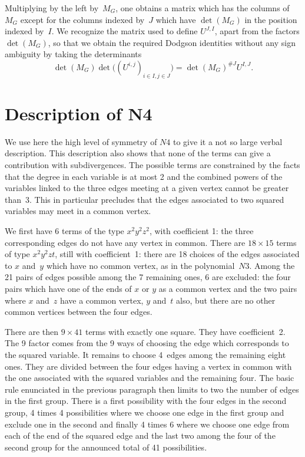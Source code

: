 \documentclass[pdftex]{sigma}
\numberwithin{equation}{section}
\begin{document}
Multiplying by the left by~$M_G$, one obtains a matrix which has the columns of~$M_G$ except for the columns indexed
by~$J$ which have $\det(M_G)$ in the position indexed by~$I$. We recognize the matrix used to define $U^{J,I}$,
apart from the factors $\det(M_G)$, so that we obtain the required Dodgson identities without any sign ambiguity by
taking the determinants
\[
	\det(M_G) \det\bigl( (U^{i,j})_{i\in I,j\in J} \bigr) = \det(M_G)^{\# J} U^{I ,J}.
\]

\section[Description of N4]{Description of $\boldsymbol{N4}$} \label{N4}

We use here the high level of symmetry of $N4$ to give it a not so large verbal description. This description also
shows that none of the terms can give a contribution with subdivergences. The possible terms are constrained by the facts
that the degree in each variable is at most 2
and the combined powers of the variables linked
to the three edges meeting at a given vertex cannot be greater than~3. This in particular precludes that the edges
associated to two squared variables may meet in a common vertex.

We first have 6 terms of the type $x^2 y^2 z^2$, with coefficient 1: the three corresponding edges do not have any vertex in
common. There are $18 \times 15$ terms of type $x^2 y^2 z t$, still with coefficient~1: there are 18 choices of the
edges associated to $x$ and~$y$ which have no common vertex, as in the polynomial~$N3$. Among the 21 pairs of edges
possible among the 7 remaining ones, 6 are excluded: the four pairs which have one of the ends of $x$ or $y$ as a
common vertex and the two pairs where $x$ and~$z$ have a common vertex, $y$ and~$t$ also, but there are no other
common vertices between the four edges.

There are then $9\times 41$ terms with exactly one square. They have coefficient~2.
The 9 factor comes from the 9 ways of choosing the edge which corresponds to the squared variable. It remains to choose
4~edges among the remaining eight ones. They are divided between the four edges having a vertex in common with the one
associated with the squared variables and the remaining four. The basic rule enunciated in the previous paragraph then
limits to two the number of edges in the first group. There is a first possibility with the four edges in the second group,
4 times 4 possibilities where we choose one edge in the first group and exclude one in the second and finally 4 times 6
where we choose one edge from each of the end of the squared edge and the last two among the four of the second group for
the announced total of 41 possibilities.
\end{document}
